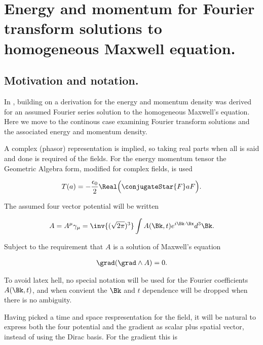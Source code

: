 

\chapter{Energy and momentum for Fourier transform solutions to homogeneous Maxwell equation.}
\label{chap:ftMaxVacuum}
\date{Dec 21, 2009}

\beginArtNoToc

\section{Motivation and notation.}

In , building on \cite{complexFieldEnergy} a derivation for the energy and momentum density was derived for an assumed Fourier series solution to the homogeneous Maxwell's equation.  Here we move to the continous case examining Fourier transform solutions and the associated energy and momentum density.

A complex (phasor) representation is implied, so taking real parts when all is said and done is required of the fields.  For the energy momentum tensor the Geometric Algebra form, modified for complex fields, is used

\begin{align}\label{eqn:ftMaxVacuum:1}
T(a) = -\frac{\epsilon_0}{2} \Real \Bigl( \conjugateStar{F} a F \Bigr).
\end{align}

The assumed four vector potential will be written

\begin{align}\label{eqn:ftMaxVacuum:2}
A = A^\mu \gamma_\mu = \inv{(\sqrt{2 \pi})^3} \int A(\Bk, t) e^{i \Bk \cdot \Bx } d^3 \Bk.
\end{align}

Subject to the requirement that $A$ is a solution of Maxwell's equation

\begin{align}\label{eqn:ftMaxVacuum:3}
\grad (\grad \wedge A) = 0.
\end{align}

To avoid latex hell, no special notation will be used for the Fourier coefficients $A(\Bk, t)$, and when convient the $\Bk$ and $t$ dependence will be dropped when there is no ambiguity.

Having picked a time and space respresentation for the field, it will be natural to express both the four potential and the gradient as scalar plus spatial vector, instead of using the Dirac basis.  For the gradient this is

